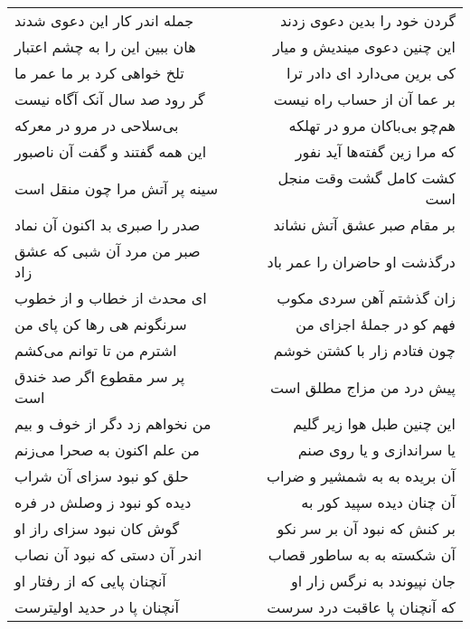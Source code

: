 \begin{center}
\begin{longtable}{l p{0.5cm} r}
جمله اندر کار این دعوی شدند
&&
گردن خود را بدین دعوی زدند
\\
هان ببین این را به چشم اعتبار
&&
این چنین دعوی میندیش و میار
\\
تلخ خواهی کرد بر ما عمر ما
&&
کی برین می‌دارد ای دادر ترا
\\
گر رود صد سال آنک آگاه نیست
&&
بر عما آن از حساب راه نیست
\\
بی‌سلاحی در مرو در معرکه
&&
هم‌چو بی‌باکان مرو در تهلکه
\\
این همه گفتند و گفت آن ناصبور
&&
که مرا زین گفته‌ها آید نفور
\\
سینه پر آتش مرا چون منقل است
&&
کشت کامل گشت وقت منجل است
\\
صدر را صبری بد اکنون آن نماد
&&
بر مقام صبر عشق آتش نشاند
\\
صبر من مرد آن شبی که عشق زاد
&&
درگذشت او حاضران را عمر باد
\\
ای محدث از خطاب و از خطوب
&&
زان گذشتم آهن سردی مکوب
\\
سرنگونم هی رها کن پای من
&&
فهم کو در جملهٔ اجزای من
\\
اشترم من تا توانم می‌کشم
&&
چون فتادم زار با کشتن خوشم
\\
پر سر مقطوع اگر صد خندق است
&&
پیش درد من مزاج مطلق است
\\
من نخواهم زد دگر از خوف و بیم
&&
این چنین طبل هوا زیر گلیم
\\
من علم اکنون به صحرا می‌زنم
&&
یا سراندازی و یا روی صنم
\\
حلق کو نبود سزای آن شراب
&&
آن بریده به به شمشیر و ضراب
\\
دیده کو نبود ز وصلش در فره
&&
آن چنان دیده سپید کور به
\\
گوش کان نبود سزای راز او
&&
بر کنش که نبود آن بر سر نکو
\\
اندر آن دستی که نبود آن نصاب
&&
آن شکسته به به ساطور قصاب
\\
آنچنان پایی که از رفتار او
&&
جان نپیوندد به نرگس زار او
\\
آنچنان پا در حدید اولیترست
&&
که آنچنان پا عاقبت درد سرست
\\
\end{longtable}
\end{center}
